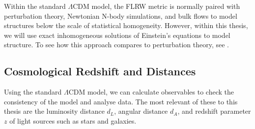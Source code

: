 \documentclass[a4paper,12pt]{report}
\begin{document}
Within the standard $\Lambda$CDM model, the FLRW metric is normally paired with perturbation theory, Newtonian N-body simulations, and bulk flows to model structures below the scale of statistical homogeneity. However, within this thesis, we will use exact inhomogeneous solutions of Einstein's equations to model structure. To see how this approach compares to perturbation theory, see \cite{RN6}.


\subsection{Cosmological Redshift and Distances}
Using the standard $\Lambda$CDM model, we can calculate observables to check the consistency of the model and analyse data. The most relevant of these to this thesis are the luminosity distance $d_L$, angular distance $d_A$, and redshift parameter $z$ of light sources such as stars and galaxies.
\end{document}
